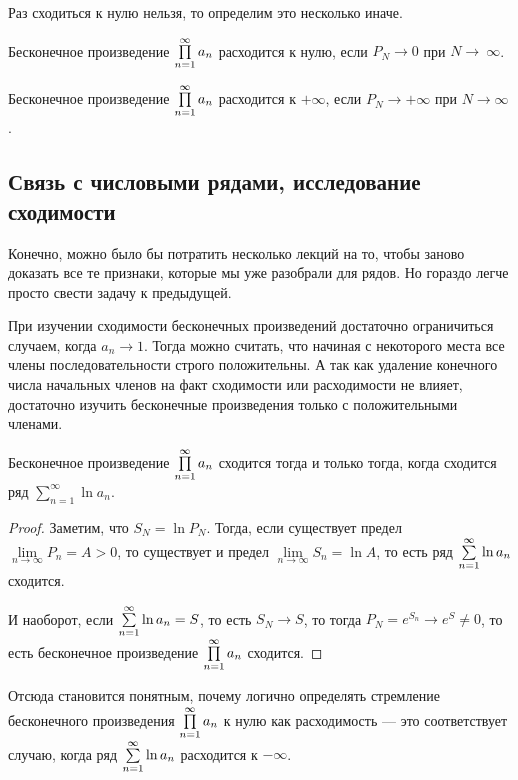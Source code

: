 Раз сходиться к нулю нельзя, то определим это несколько иначе.
\begin{Def}
Бесконечное произведение $\prod\limits_{n=1}^{\infty} a_n$ расходится к нулю, если $P_N \to 0$ при $N \to~\infty$.

Бесконечное произведение $\prod\limits_{n=1}^{\infty} a_n$ расходится к $+\infty$, если $P_N \to +\infty$ при $N \to \infty$.
\end{Def}

\subsection{Связь с числовыми рядами, исследование сходимости}

Конечно, можно было бы потратить несколько лекций на то, чтобы заново доказать все те признаки, которые мы уже разобрали для рядов. Но гораздо легче просто свести задачу к предыдущей.

При изучении сходимости бесконечных произведений достаточно ограничиться случаем, когда $a_n \to 1$. Тогда можно считать, что начиная с некоторого места все члены последовательности строго положительны. А так как удаление конечного числа начальных членов на факт сходимости или расходимости не влияет, достаточно изучить бесконечные произведения только с положительными членами.

\begin{Statement}
Бесконечное произведение $\prod\limits_{n=1}^{\infty} a_n$ сходится тогда и только тогда, когда сходится ряд $\sum\limits_{n=1}^{\infty}\ln a_n$.
\end{Statement}
\begin{proof}
Заметим, что $S_N = \ln P_N$. Тогда, если существует предел $\lim\limits_{n \to \infty} P_n = A > 0$, то существует и предел $\lim\limits_{n\to \infty} S_n = \ln A$, то есть ряд $\sum\limits_{n=1}^{\infty}\ln a_n$ сходится.

И наоборот, если $\sum\limits_{n=1}^{\infty}\ln a_n = S$, то есть $S_N \to S$, то тогда $P_N = e^{S_n} \to e^S \neq 0$, то есть бесконечное произведение $\prod\limits_{n=1}^{\infty} a_n$ сходится. 
\end{proof}

Отсюда становится понятным, почему логично определять стремление бесконечного произведения $\prod\limits_{n=1}^{\infty} a_n$ к нулю как расходимость --- это соответствует случаю, когда ряд $\sum\limits_{n=1}^{\infty}\ln a_n$ расходится к $-\infty$.

